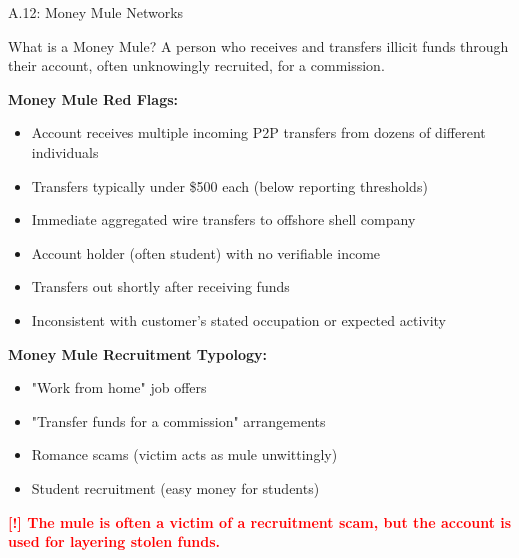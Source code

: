 \documentclass[11pt,a4paper]{beamer}
\newcommand{\redflag}[1]{\textcolor{red}{\textbf{[!] #1}}}
\begin{document}
	\begin{frame}{A.12: Money Mule Networks}
		\begin{block}{What is a Money Mule?}
			A person who receives and transfers illicit funds through their account, often unknowingly recruited, for a commission.
		\end{block}
		\textbf{Money Mule Red Flags:}
		\begin{itemize}
			\item Account receives multiple incoming P2P transfers from dozens of different individuals
			\item Transfers typically under \$500 each (below reporting thresholds)
			\item Immediate aggregated wire transfers to offshore shell company
			\item Account holder (often student) with no verifiable income
			\item Transfers out shortly after receiving funds
			\item Inconsistent with customer's stated occupation or expected activity
		\end{itemize}
		\textbf{Money Mule Recruitment Typology:}
		\begin{itemize}
			\item "Work from home" job offers
			\item "Transfer funds for a commission" arrangements
			\item Romance scams (victim acts as mule unwittingly)
			\item Student recruitment (easy money for students)
		\end{itemize}
		\redflag{The mule is often a victim of a recruitment scam, but the account is used for layering stolen funds.}
	\end{frame}
	
\end{document}

